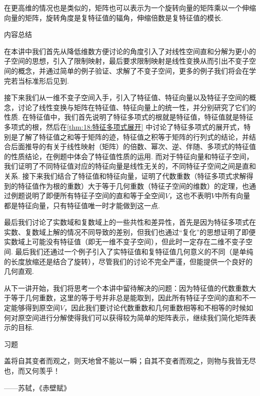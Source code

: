 在更高维的情况也是类似的，矩阵也可以表示为一个旋转向量的矩阵乘以一个伸缩向量的矩阵，旋转角度是复特征值的辐角，伸缩倍数是复特征值的模长.

\vspace{2ex}
\centerline{\heiti \Large 内容总结}

在本讲中我们首先从降低维数方便讨论的角度引入了对线性空间直和分解为更小的子空间的思想，引入了限制映射，最后要求限制映射是线性变换从而引出不变子空间的概念，并通过简单的例子验证、求解了不变子空间，更多的例子我们将会在学完若当标准形后见到.

接下来我们从一维不变子空间入手，引入了特征值、特征向量以及特征子空间的概念，讨论了线性变换与矩阵在特征值、特征向量上的统一性，并分别研究了它们的性质. 在特征值中，我们首先说明了特征多项式的根就是特征值，特征值就是特征多项式的根，然后在\autoref{thm:18:特征多项式展开} 中讨论了特征多项式的展开式，特别是了解了特征值之和等于矩阵的迹，特征值之积等于矩阵的行列式的结论，并结合后面推导的有关于线性映射（矩阵）的倍数、幂次、逆、伴随、多项式的特征值的性质结论，在例题中体会了特征值性质的运用. 而对于特征向量和特征子空间，我们证明了不同特征值对应的特征向量是线性无关的，不同特征子空间之间是直和关系. 接下来我们结合了特征值和特征向量，证明了代数重数（特征多项式求解得到的特征值作为根的重数）大于等于几何重数（特征子空间的维数）的定理，也通过例题说明了即便所有特征子空间的直和等于全空间$V$，这也不表明$V$中所有向量都是特征向量，只有特征值唯一时才能做到这一点.

最后我们讨论了实数域和复数域上的一些共性和差异性，首先是因为特征多项式在实数、复数域上解的情况不同导致的差别，但我们也通过``复化''的思想证明了即便实数域上可能没有特征值（即无一维不变子空间），但此时一定存在二维不变子空间. 最后我们还通过一个例子引入了实特征值和复特征值几何意义的不同（是单纯的长度放缩还是结合了旋转），尽管我们的讨论不完全严谨，但能提供一个良好的几何直观.

从下一讲开始，我们将思考一个本讲中留待解决的问题：因为特征值的代数重数大于等于几何重数，这里的等于号并非总是能取到，因此所有特征子空间的直和不一定能够得到原空间$V$，因此我们要讨论代数重数和几何重数相等和不相等的时候如何对原空间进行分解使得我们可以获得较为简单的矩阵表示，继续我们简化矩阵表示的目标.

\vspace{2ex}
\centerline{\heiti \Large 习题}

\vspace{2ex}
{\kaishu 盖将自其变者而观之，则天地曾不能以一瞬；自其不变者而观之，则物与我皆无尽也，而又何羡乎！}
\begin{flushright}
    \kaishu
    ——苏轼，《赤壁赋》
\end{flushright}

